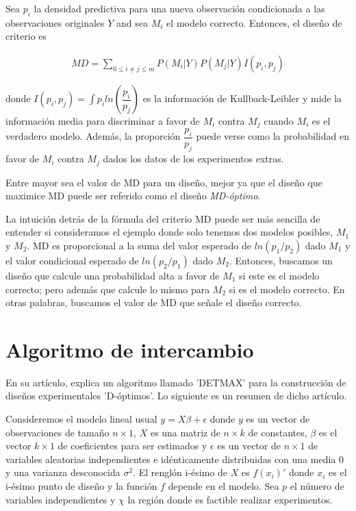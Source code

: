 Sea $p_i$ la densidad predictiva para una nueva observación condicionada a las observaciones originales $Y$ and sea $M_i$ el modelo correcto. Entonces, el diseño de criterio es 

\begin{equation*}
	\begin{aligned}
		MD = \sum_{0 \leq i \neq j \leq m} P(M_i | Y)  P(M_j | Y) I(p_i, p_j)
	\end{aligned}
\end{equation*}

donde $I(p_i, p_j) = \int p_i ln(\dfrac{p_i}{p_j})$ es la información de Kullback-Leibler y mide la información media para discriminar a favor de $M_i$ contra $M_j$ cuando $M_i$ es el verdadero modelo. Además, la proporción $\dfrac{p_i}{p_j}$ puede verse como la probabilidad en favor de $M_i$ contra $M_j$ dados los datos de los experimentos extras. 

Entre mayor sea el valor de MD para un diseño, mejor ya que el diseño que maximice MD puede ser referido como el diseño \textit{MD-óptimo}. 

La intuición detrás de la fórmula del criterio MD puede ser más sencilla de entender si consideramos el ejemplo donde solo tenemos dos modelos posibles, $M_1$ y $M_2$. MD es proporcional a la suma del valor esperado de $ln(p_1/p_2)$ dado $M_1$ y el valor condicional esperado de  $ln(p_2/p_1)$ dado $M_2$. Entonces, buscamos un diseño que calcule una probabilidad alta a favor de $M_1$ si este es el modelo correcto; pero además que calcule lo mismo para $M_2$ si es el modelo correcto. En otras palabras, buscamos el valor de MD que señale el diseño correcto. 

\section{Algoritmo de intercambio}
En su artículo, \cite{mitchelldetmax} explica un algoritmo llamado 'DETMAX' para la construcción de diseños experimentales 'D-óptimos'. Lo siguiente es un resumen de dicho artículo. 

Consideremos el modelo lineal usual $y = X \beta + \epsilon$ donde $y$ es un vector de observaciones de tamaño $n \times 1$, $X$ es una matriz de $n \times k$ de constantes, $\beta$ es el vector $k \times 1$ de coeficientes para ser estimados y $\epsilon$ es un vector de $n \times 1$ de variables aleatorias independientes e idénticamente distribuidas con una media $0$ y una varianza desconocida $\sigma^{2}$. El renglón i-ésimo de $X$ es $f(x_i)'$ donde $x_i$ es el i-ésimo punto de diseño y la función $f$ depende en el modelo. Sea $p$ el número de variables independientes y $\chi$ la región donde es factible realizar experimentos.

